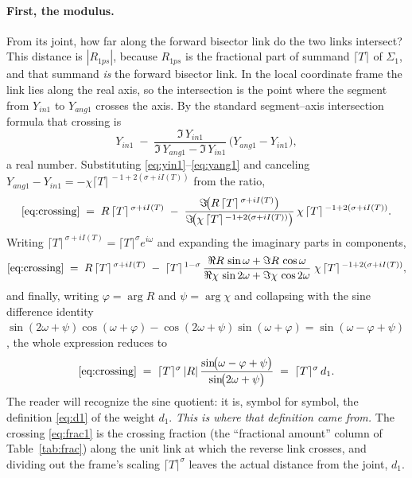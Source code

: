 \documentclass[11pt]{article}
\theoremstyle{definition}
\begin{document}
\paragraph{First, the modulus.} From its joint, how far along the forward
bisector link do the two links intersect? This distance is $|R_{1ps}|$,
because $R_{1ps}$ is the fractional part of summand $\lceil T\rceil$ of
$\Sigma_1$, and that summand \emph{is} the forward bisector link. In the
local coordinate frame the link lies along the real axis, so the intersection is the point
where the segment from $Y_{in1}$ to $Y_{ang1}$ crosses the axis. By the
standard segment--axis intersection formula that crossing is
\begin{equation}\label{eq:crossing}
Y_{in1}
\;-\;
\frac{\Im\,Y_{in1}}
     {\Im\,Y_{ang1}-\Im\,Y_{in1}}\,
\bigl(Y_{ang1}-Y_{in1}\bigr),
\end{equation}
a real number. Substituting \eqref{eq:yin1}--\eqref{eq:yang1} and canceling
$Y_{ang1}-Y_{in1}=-\chi\lceil T\rceil^{\,-1+2(\sigma+iI(T))}$ from the ratio,
\begin{equation}\label{eq:yang3lin}
\eqref{eq:crossing}
\;=\;
R\,\lceil T\rceil^{\,\sigma+iI(T)}
\;-\;
\frac{\Im\!\bigl(R\,\lceil T\rceil^{\,\sigma+iI(T)}\bigr)}
     {\Im\!\bigl(\chi\,\lceil T\rceil^{\,-1+2(\sigma+iI(T))}\bigr)}\,
\chi\,\lceil T\rceil^{\,-1+2(\sigma+iI(T))}.
\end{equation}
Writing $\lceil T\rceil^{\,\sigma+iI(T)}=\lceil T\rceil^{\sigma}e^{i\omega}$
and expanding the imaginary parts in components,
\begin{equation}\label{eq:compact5}
\eqref{eq:crossing}
\;=\;
R\,\lceil T\rceil^{\,\sigma+iI(T)}
\;-\;
\lceil T\rceil^{\,1-\sigma}\,
\frac{\Re R\,\sin\omega+\Im R\,\cos\omega}
     {\Re\chi\,\sin 2\omega+\Im\chi\,\cos 2\omega}\;
\chi\,\lceil T\rceil^{\,-1+2(\sigma+iI(T))},
\end{equation}
and finally, writing $\varphi=\arg R$ and $\psi=\arg\chi$ and collapsing with
the sine difference identity
$\sin(2\omega+\psi)\cos(\omega+\varphi)-\cos(2\omega+\psi)\sin(\omega+\varphi)
=\sin(\omega-\varphi+\psi)$, the whole expression reduces to
\begin{equation}\label{eq:frac1}
\eqref{eq:crossing}
\;=\;
\lceil T\rceil^{\sigma}\,|R|\,
\frac{\sin\!\bigl(\omega-\varphi+\psi\bigr)}{\sin\!\bigl(2\omega+\psi\bigr)}
\;=\; \lceil T\rceil^{\sigma}\, d_1 .
\end{equation}
The reader will recognize the sine quotient: it is, symbol for symbol, the
definition \eqref{eq:d1} of the weight $d_1$. \emph{This is where that
definition came from.} The crossing \eqref{eq:frac1} is the crossing
fraction (the ``fractional amount'' column of Table~\ref{tab:frac})
along the unit link at which the reverse link crosses, and dividing out the frame's
scaling $\lceil T\rceil^{\sigma}$ leaves the actual distance from the joint,
$d_1$.
\end{document}
